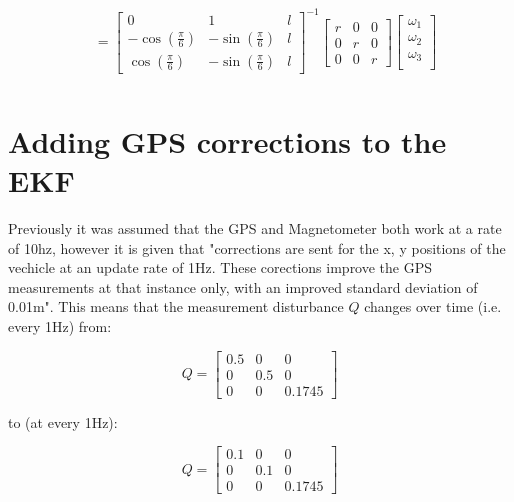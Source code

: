 \documentclass{article}
\begin{document}
\begin{align*}
		&=
			\begin{bmatrix}
				0 & 1 & l \\
				-\cos(\frac{\pi}{6}) & -\sin(\frac{\pi}{6}) & l \\
				\cos(\frac{\pi}{6}) & -\sin(\frac{\pi}{6}) & l
			\end{bmatrix}^{-1}
			\begin{bmatrix}
				r & 0 & 0 \\
				0 & r & 0 \\
				0 & 0 & r
			\end{bmatrix}
			\begin{bmatrix}
				\omega_{1} \\
				\omega_{2} \\
				\omega_{3} \\
			\end{bmatrix} \\
\end{align*}



\newpage
\section{Adding GPS corrections to the EKF}

Previously it was assumed that the GPS and Magnetometer both work at a rate of 
10hz, however it is given that "corrections are sent for the x, y positions of 
the vechicle at an update rate of 1Hz. These corections improve the GPS 
measurements at that instance only, with an improved standard deviation of 
0.01m". This means that the measurement disturbance $Q$ changes over time (i.e. 
every 1Hz) from:

\begin{equation}
	Q = 
	\begin{bmatrix}
		0.5 & 0 & 0 \\
		0 & 0.5 & 0 \\
		0 & 0 & 0.1745		
	\end{bmatrix}
\end{equation}

to (at every 1Hz):

\begin{equation}
	Q = 
	\begin{bmatrix}
		0.1 & 0 & 0 \\
		0 & 0.1 & 0 \\
		0 & 0 & 0.1745		
	\end{bmatrix}
\end{equation}
\end{document}
